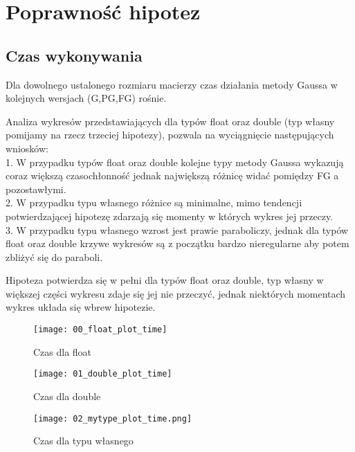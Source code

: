 \documentclass[10pt]{article}
\newenvironment{hypothesis}[2][Hipoteza]{\begin{trivlist}
\item[\hskip \labelsep {\bfseries #1}\hskip \labelsep {\bfseries #2.}]}{\end{trivlist}}
\newenvironment{corollary}[2][Wniosek]{\begin{trivlist}
\item[\hskip \labelsep {\bfseries #1}\hskip \labelsep {\bfseries #2.}]}{\end{trivlist}}
\begin{document}
\section {Poprawność hipotez}
\subsection{Czas wykonywania}
\begin{hypothesis}{1}
Dla dowolnego ustalonego rozmiaru macierzy czas działania metody Gaussa w kolejnych wersjach (G,PG,FG) rośnie.
\end{hypothesis}
Analiza wykresów przedstawiających dla typów float oraz double (typ własny pomijamy na rzecz trzeciej hipotezy), pozwala na wyciągnięcie następujących wniosków:\\
1. W przypadku typów float oraz double kolejne typy metody Gaussa wykazują coraz większą czasochłonność jednak największą różnicę widać pomiędzy FG a pozostawłymi.\\
2. W przypadku typu własnego różnice są minimalne, mimo tendencji potwierdzającej hipotezę zdarzają się momenty w których wykres jej przeczy.\\
3. W przypadku typu własnego wzrost jest prawie paraboliczy, jednak dla typów float oraz double krzywe wykresów są z początku bardzo nieregularne aby potem zbliżyć się do paraboli.\\
\begin{corollary}{1}
Hipoteza potwierdza się w pełni dla typów float oraz double, typ własny w większej części wykresu zdaje się jej nie przeczyć, jednak niektórych momentach wykres układa się wbrew hipotezie.
\end{corollary}

\begin{figure}[!htb]
   \begin{minipage}{0.48\textwidth}
     \centering
     \texttt{[image: 00\_float\_plot\_time]}
     \caption{Czas dla float}\label{Fig:Data1}
   \end{minipage}\hfill
   \begin{minipage}{0.48\textwidth}
     \centering
     \texttt{[image: 01\_double\_plot\_time]}
     \caption{Czas dla double}\label{Fig:Data2}
   \end{minipage}
\end{figure}
\begin{figure}[!htb]
\centering
\texttt{[image: 02\_mytype\_plot\_time.png]}\\
\caption{Czas dla typu własnego}
\end{figure}
\end{document}
